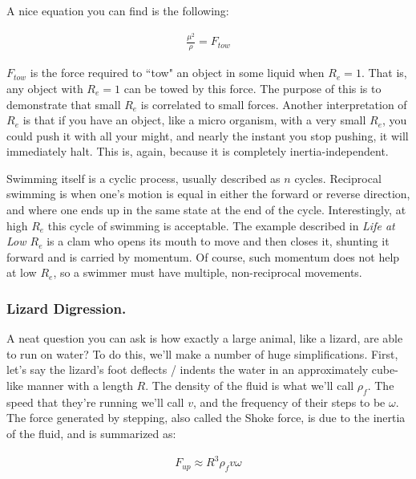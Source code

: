 A nice equation you can find is the following: 

\begin{equation} \label{tow}
\begin{split}
\frac{\mu^2}{\rho} = F_{tow}
\end{split}
\end{equation}

$F_{tow}$ is the force required to ``tow" an object in some liquid when $R_e = 1$. That is, any object with $R_e = 1$ can be towed by this force. The purpose of this is to demonstrate that small $R_e$ is correlated to small forces. Another interpretation of $R_e$ is that if you have an object, like a micro organism, with a very small $R_e$, you could push it with all your might, and nearly the instant you stop pushing, it will immediately halt. This is, again, because it is completely inertia-independent.\newline

Swimming itself is a cyclic process, usually described as $n$ cycles. Reciprocal swimming is when one's motion is equal in either the forward or reverse direction, and where one ends up in the same state at the end of the cycle. Interestingly, at high $R_e$ this cycle of swimming is acceptable. The example described in \textit{Life at Low $R_e$} is a clam who opens its mouth to move and then closes it, shunting it forward and is carried by momentum. Of course, such momentum does not help at low $R_e$, so a swimmer must have multiple, non-reciprocal movements. 

\subsubsection{Lizard Digression.}

A neat question you can ask is how exactly a large animal, like a lizard, are able to run on water? To do this, we'll make a number of huge simplifications. First, let's say the lizard's foot deflects / indents the water in an approximately cube-like manner with a length $R$. The density of the fluid is what we'll call $\rho_f$. The speed that they're running we'll call $v$, and the frequency of their steps to be $\omega$. The force generated by stepping, also called the Shoke force, is due to the inertia of the fluid, and is summarized as: 

\begin{equation} \label{lizard1}
\begin{split}
F_{up} \approx R^3\rho_f v\omega
\end{split}
\end{equation}

